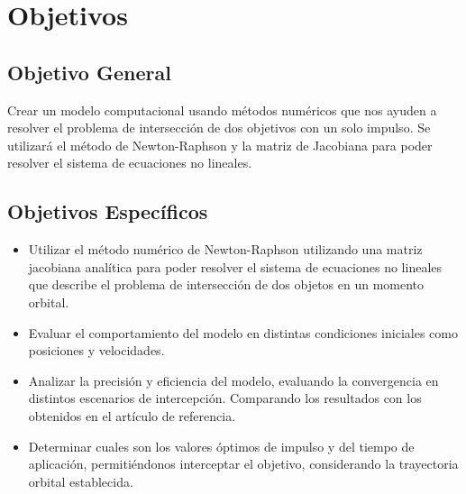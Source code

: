\section{Objetivos}
\subsection{Objetivo General}
Crear un modelo computacional usando métodos numéricos que nos ayuden a resolver el problema de intersección de dos objetivos con un solo impulso. Se utilizará el método de Newton-Raphson y la matriz de Jacobiana para poder resolver el sistema de ecuaciones no lineales.
\subsection{Objetivos Específicos}
\begin{itemize}
    \item Utilizar el método numérico de Newton-Raphson utilizando una matriz jacobiana analítica para poder resolver el sistema de ecuaciones no lineales que describe el problema de intersección de dos objetos en un momento orbital.
    \item Evaluar el comportamiento del modelo en distintas condiciones iniciales como posiciones y velocidades.
    \item Analizar la precisión y eficiencia del modelo, evaluando la convergencia en distintos escenarios de intercepción. Comparando los resultados con los obtenidos en el artículo de referencia.
    \item Determinar cuales son los valores óptimos de impulso y del tiempo de aplicación, permitiéndonos interceptar el objetivo, considerando la trayectoria orbital establecida.
\end{itemize}
